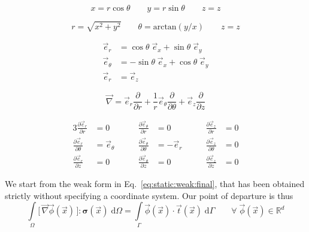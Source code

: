 \documentclass[times,namecite]{goose-article}
\begin{document}
\begin{equation}
  x = r \cos \theta \qquad
  y = r \sin \theta \qquad
  z = z
\end{equation}

\begin{equation}
  r      = \sqrt{ x^2 + y^2 }                \qquad
  \theta = \mathrm{arctan}\left( y/x \right) \qquad
  z      = z
\end{equation}

\begin{align}
  \vec{e}_r      &=   \cos \theta \; \vec{e}_x + \sin \theta \; \vec{e}_y \nonumber \\
  \vec{e}_\theta &= - \sin \theta \; \vec{e}_x + \cos \theta \; \vec{e}_y \nonumber \\
  \vec{e}_r      &= \vec{e}_z
\end{align}





\begin{equation}
  \vec{\nabla} =
  \vec{e}_r \frac{\partial}{\partial r} +
  \frac{1}{r} \vec{e}_\theta \frac{\partial}{\partial \theta} +
  \vec{e}_z \frac{\partial}{\partial z}
\end{equation}

\begin{alignat}{3}
  \frac{\partial \vec{e}_r}{\partial r     } &= 0              &\qquad \frac{\partial \vec{e}_\theta}{\partial r     } &= 0           &\qquad \frac{\partial \vec{e}_z}{\partial r     } &= 0 \nonumber \\
  \frac{\partial \vec{e}_r}{\partial \theta} &= \vec{e}_\theta &\qquad \frac{\partial \vec{e}_\theta}{\partial \theta} &= - \vec{e}_r &\qquad \frac{\partial \vec{e}_z}{\partial \theta} &= 0 \nonumber \\
  \frac{\partial \vec{e}_r}{\partial z     } &= 0              &\qquad \frac{\partial \vec{e}_\theta}{\partial z     } &= 0           &\qquad \frac{\partial \vec{e}_z}{\partial z     } &= 0
\end{alignat}


We start from the weak form in Eq.~\eqref{eq:static:weak:final}, that has been obtained strictly without specifying a coordinate system. Our point of departure is thus
\begin{equation}
  \int\limits_\Omega
    \big[\, \vec{\nabla} \vec{\phi}(\vec{x}) \,\big] : \bm{\sigma}(\vec{x}) \;
  \mathrm{d}\Omega
  =
  \int\limits_\Gamma
    \vec{\phi}(\vec{x}) \cdot \vec{t}(\vec{x}) \;
  \mathrm{d}\Gamma
  \qquad
  \forall \; \vec{\phi}(\vec{x}) \in \mathbb{R}^d
\end{equation}
\end{document}
